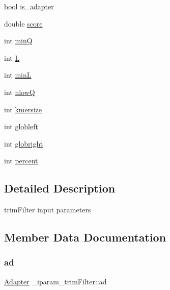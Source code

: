 \begin{DoxyCompactItemize}
\item 
\mbox{\hyperlink{defines_8h_abb452686968e48b67397da5f97445f5b}{bool}} \mbox{\hyperlink{struct__iparam__trimFilter_a6d015b5bf1568c362d9ca0ff37b751f8}{is\+\_\+adapter}}
\item 
double \mbox{\hyperlink{struct__iparam__trimFilter_a193ef2030f6eb8db0b75afbbd152d6a1}{score}}
\item 
int \mbox{\hyperlink{struct__iparam__trimFilter_a1e2b69f148d9299815af6ab7f575ad1a}{minQ}}
\item 
int \mbox{\hyperlink{struct__iparam__trimFilter_a72fcc236d4136d2405a04f155b515894}{L}}
\item 
int \mbox{\hyperlink{struct__iparam__trimFilter_ac2b43664ca0c95a8572f97254893d675}{minL}}
\item 
int \mbox{\hyperlink{struct__iparam__trimFilter_aaeab85398303eada76cb6f32841fa094}{nlowQ}}
\item 
int \mbox{\hyperlink{struct__iparam__trimFilter_a6a1118d39cdaa79f48f2d010a6018e5c}{kmersize}}
\item 
int \mbox{\hyperlink{struct__iparam__trimFilter_a2e626c5776d4423d20d5ec7606fe9b81}{globleft}}
\item 
int \mbox{\hyperlink{struct__iparam__trimFilter_ad5fb4ca1786b14cd63a8467187474f51}{globright}}
\item 
int \mbox{\hyperlink{struct__iparam__trimFilter_a8ed026b1de4fccc7288258c3a8faa395}{percent}}
\end{DoxyCompactItemize}


\subsection{Detailed Description}
trim\+Filter input parameters 

\subsection{Member Data Documentation}
\mbox{\label{struct__iparam__trimFilter_aba4b2762da9029d272905c558986b3f7}} 
\subsubsection{\texorpdfstring{ad}{ad}}
{\footnotesize\ttfamily \mbox{\hyperlink{struct__trimFilter_8h_a3442d07a10a4ab75064687f3c244e370}{Adapter}} \+\_\+iparam\+\_\+trim\+Filter\+::ad}

